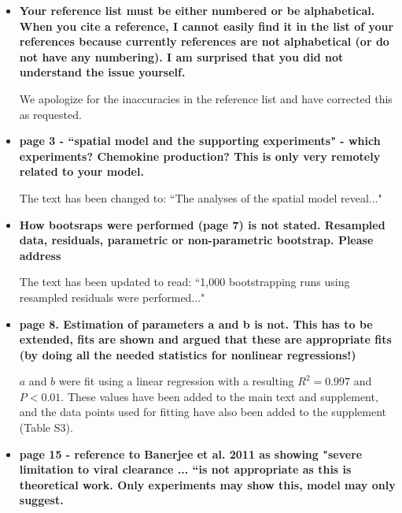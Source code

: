 \documentclass[10pt]{article}
\newcommand{\new}[1]{{\color{dkgreen}#1}}
\newenvironment{response}{\fontfamily{cms}\selectfont\small}{\par}
\begin{document}
\begin{itemize}

\item \textbf{Your reference list must be either numbered or be alphabetical. When you cite a reference, I cannot easily find it in the list of your references because currently references are not alphabetical (or do not have any numbering). I am surprised that you did not understand the issue yourself.}

\begin{response}
We apologize for the inaccuracies in the reference list and have corrected this as requested.
\end{response}

\item \textbf{page 3 - ``spatial model and the supporting experiments" - which experiments? Chemokine production? This is only very remotely related to your model.}

\begin{response}
The text has been changed to: ``\new{The analyses of} the spatial model reveal..."
\end{response}

\item \textbf{How bootsraps were performed (page 7) is not stated. Resampled data, residuals, parametric or non-parametric bootstrap. Please address}

\begin{response}
The text has been updated to read: ``1,000 bootstrapping runs \new{using resampled residuals} were performed..."
\end{response}

\item \textbf{page 8. Estimation of parameters a and b is not. This has to be extended, fits are shown and argued that these are appropriate fits (by doing all the needed statistics for nonlinear regressions!)}

\begin{response}
$a$ and $b$ were fit using a linear regression with a resulting $R^2 = 0.997$ and $P < 0.01$.  These values have been added to the main text and supplement, and the data points used for fitting have also been added to the supplement (Table S3).
\end{response}

\item \textbf{page 15 - reference to Banerjee et al. 2011 as showing "severe limitation to viral clearance ... ``is not appropriate as this is theoretical work. Only experiments may show this, model may only suggest.}


\end{itemize}
\end{document}
